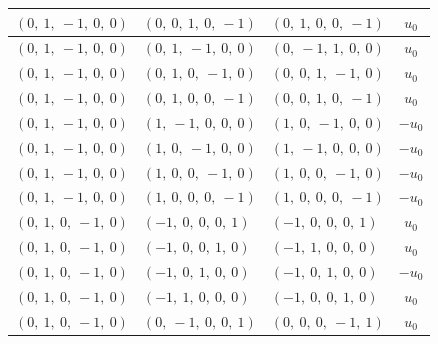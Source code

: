 \documentclass[11pt]{article}
\theoremstyle{definition}
\begin{document}
\begin{longtable}{|l|l|l|c|}
    \hline
    $\left( 0, \  1, \  -1, \  0, \  0\right)$ & $\left( 0, \  0, \  1, \  0, \  -1\right)$ & $\left( 0, \  1, \  0, \  0, \  -1\right)$ & $u_{0}$ \\
    \hline
    $\left( 0, \  1, \  -1, \  0, \  0\right)$ & $\left( 0, \  1, \  -1, \  0, \  0\right)$ & $\left( 0, \  -1, \  1, \  0, \  0\right)$ & $u_{0}$ \\
    \hline
    $\left( 0, \  1, \  -1, \  0, \  0\right)$ & $\left( 0, \  1, \  0, \  -1, \  0\right)$ & $\left( 0, \  0, \  1, \  -1, \  0\right)$ & $u_{0}$ \\
    \hline
    $\left( 0, \  1, \  -1, \  0, \  0\right)$ & $\left( 0, \  1, \  0, \  0, \  -1\right)$ & $\left( 0, \  0, \  1, \  0, \  -1\right)$ & $u_{0}$ \\
    \hline
    $\left( 0, \  1, \  -1, \  0, \  0\right)$ & $\left( 1, \  -1, \  0, \  0, \  0\right)$ & $\left( 1, \  0, \  -1, \  0, \  0\right)$ & $- u_{0}$ \\
    \hline
    $\left( 0, \  1, \  -1, \  0, \  0\right)$ & $\left( 1, \  0, \  -1, \  0, \  0\right)$ & $\left( 1, \  -1, \  0, \  0, \  0\right)$ & $- u_{0}$ \\
    \hline
    $\left( 0, \  1, \  -1, \  0, \  0\right)$ & $\left( 1, \  0, \  0, \  -1, \  0\right)$ & $\left( 1, \  0, \  0, \  -1, \  0\right)$ & $- u_{0}$ \\
    \hline
    $\left( 0, \  1, \  -1, \  0, \  0\right)$ & $\left( 1, \  0, \  0, \  0, \  -1\right)$ & $\left( 1, \  0, \  0, \  0, \  -1\right)$ & $- u_{0}$ \\
    \hline
    $\left( 0, \  1, \  0, \  -1, \  0\right)$ & $\left( -1, \  0, \  0, \  0, \  1\right)$ & $\left( -1, \  0, \  0, \  0, \  1\right)$ & $u_{0}$ \\
    \hline
    $\left( 0, \  1, \  0, \  -1, \  0\right)$ & $\left( -1, \  0, \  0, \  1, \  0\right)$ & $\left( -1, \  1, \  0, \  0, \  0\right)$ & $u_{0}$ \\
    \hline
    $\left( 0, \  1, \  0, \  -1, \  0\right)$ & $\left( -1, \  0, \  1, \  0, \  0\right)$ & $\left( -1, \  0, \  1, \  0, \  0\right)$ & $- u_{0}$ \\
    \hline
    $\left( 0, \  1, \  0, \  -1, \  0\right)$ & $\left( -1, \  1, \  0, \  0, \  0\right)$ & $\left( -1, \  0, \  0, \  1, \  0\right)$ & $u_{0}$ \\
    \hline
    $\left( 0, \  1, \  0, \  -1, \  0\right)$ & $\left( 0, \  -1, \  0, \  0, \  1\right)$ & $\left( 0, \  0, \  0, \  -1, \  1\right)$ & $u_{0}$ \\

\end{longtable}
\end{document}
